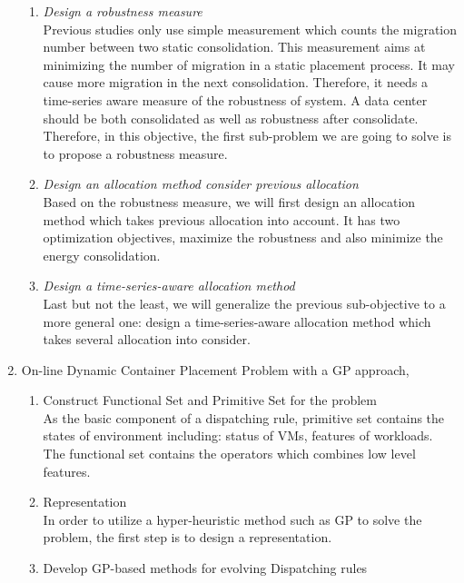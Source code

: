 \begin{enumerate}
	\begin{enumerate}
		\item \emph{Design a robustness measure} \\
 		Previous studies only use simple measurement which counts the migration number between two static consolidation. This measurement aims at minimizing the number of migration in a static placement process. It may cause more migration in the next consolidation. Therefore, it needs a time-series aware measure of the robustness of system. A data center should be both consolidated as well as robustness after consolidate. Therefore, in this objective, the first sub-problem we are going to solve is to propose a robustness measure.
		\item \emph{Design an allocation method consider previous allocation} \\
		Based on the robustness measure, we will first design an allocation method 
		which takes previous allocation into account. It has two optimization objectives, maximize the robustness and also minimize the energy consolidation.
		\item \emph{Design a time-series-aware allocation method}\\
		Last but not the least, we will generalize the previous sub-objective to a more general one: design a time-series-aware allocation method which takes several allocation into consider.
	\end{enumerate}

	\item On-line Dynamic Container Placement Problem with a GP approach,
	\begin{enumerate}
		\item Construct Functional Set and Primitive Set for the problem \\
		As the basic component of a dispatching rule, primitive set contains the states of environment including: status of VMs, features of workloads. The functional set 
		contains the operators which combines low level features.
		\item Representation \\
		In order to utilize a hyper-heuristic method such as GP to solve the problem, 
		the first step is to design a representation. 
		\item Develop GP-based methods for evolving Dispatching rules \\
	\end{enumerate}


\end{enumerate}
